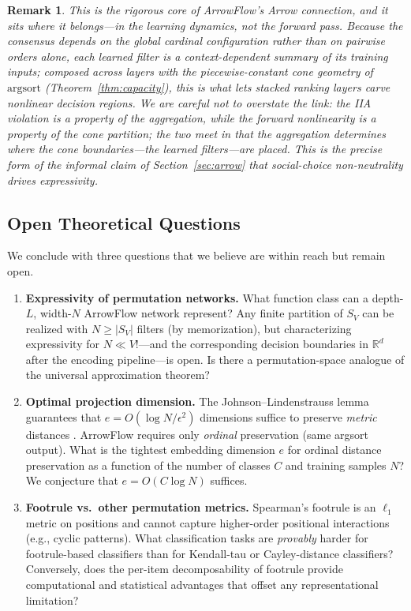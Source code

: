 \documentclass[12pt]{article}
\newcommand{\R}{\mathbb{R}}
\newcommand{\argsort}{\mathrm{argsort}}
\newtheorem{remark}{Remark}
\begin{document}
\begin{remark}
This is the rigorous core of ArrowFlow's Arrow connection, and it sits where it belongs---in the \emph{learning} dynamics, not the forward pass.  Because the consensus depends on the global cardinal configuration rather than on pairwise orders alone, each learned filter is a \emph{context-dependent} summary of its training inputs; composed across layers with the piecewise-constant cone geometry of $\argsort$ (Theorem~\ref{thm:capacity}), this is what lets stacked ranking layers carve nonlinear decision regions.  We are careful not to overstate the link: the IIA violation is a property of the \emph{aggregation}, while the forward nonlinearity is a property of the \emph{cone partition}; the two meet in that the aggregation determines \emph{where} the cone boundaries---the learned filters---are placed.  This is the precise form of the informal claim of Section~\ref{sec:arrow} that social-choice non-neutrality drives expressivity.
\end{remark}


\subsection{Open Theoretical Questions}

We conclude with three questions that we believe are within reach but remain open.

\begin{enumerate}[leftmargin=2em]
\item \textbf{Expressivity of permutation networks.} What function class can a depth-$L$, width-$N$ ArrowFlow network represent? Any finite partition of $S_V$ can be realized with $N \geq |S_V|$ filters (by memorization), but characterizing expressivity for $N \ll V!$---and the corresponding decision boundaries in $\R^d$ after the encoding pipeline---is open. Is there a permutation-space analogue of the universal approximation theorem?

\item \textbf{Optimal projection dimension.} The Johnson--Lindenstrauss lemma guarantees that $e = O(\log N / \epsilon^2)$ dimensions suffice to preserve \emph{metric} distances \citep{johnson1984extensions}. ArrowFlow requires only \emph{ordinal} preservation (same argsort output). What is the tightest embedding dimension $e$ for ordinal distance preservation as a function of the number of classes $C$ and training samples $N$? We conjecture that $e = O(C \log N)$ suffices.

\item \textbf{Footrule vs.\ other permutation metrics.} Spearman's footrule is an $\ell_1$ metric on positions and cannot capture higher-order positional interactions (e.g., cyclic patterns). What classification tasks are \emph{provably} harder for footrule-based classifiers than for Kendall-tau or Cayley-distance classifiers? Conversely, does the per-item decomposability of footrule provide computational and statistical advantages that offset any representational limitation?
\end{enumerate}
\end{document}
